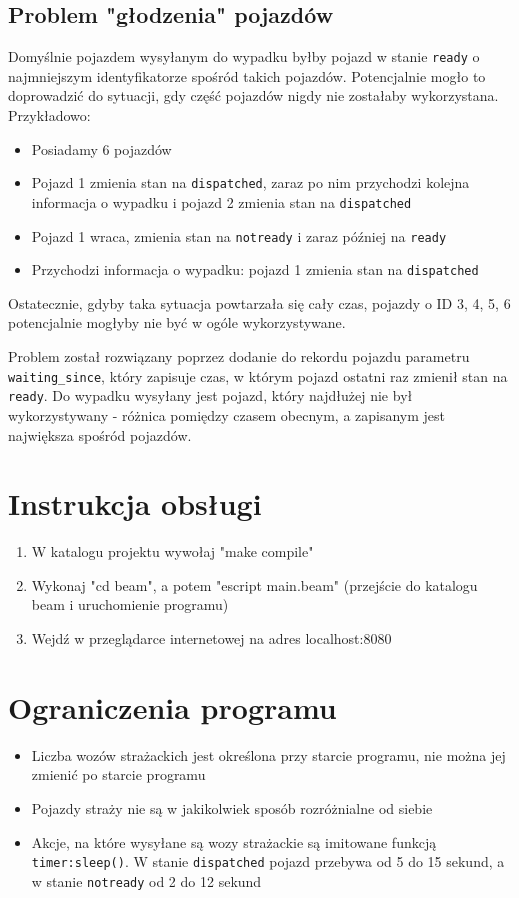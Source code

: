 \documentclass{article}
\begin{document}
\subsection{Problem "głodzenia" pojazdów}
Domyślnie pojazdem wysyłanym do wypadku byłby pojazd w stanie \texttt{ready} o najmniejszym identyfikatorze spośród takich pojazdów. Potencjalnie mogło to doprowadzić do sytuacji, gdy część pojazdów nigdy nie zostałaby wykorzystana. Przykładowo:
\begin{itemize}
	\item Posiadamy 6 pojazdów
	\item Pojazd 1 zmienia stan na \texttt{dispatched}, zaraz po nim przychodzi kolejna informacja o wypadku i pojazd 2 zmienia stan na \texttt{dispatched}
	\item Pojazd 1 wraca, zmienia stan na \texttt{notready} i zaraz później na \texttt{ready}
	\item Przychodzi informacja o wypadku: pojazd 1 zmienia stan na \texttt{dispatched}
\end{itemize}
Ostatecznie, gdyby taka sytuacja powtarzała się cały czas, pojazdy o ID 3, 4, 5, 6 potencjalnie mogłyby nie być w ogóle wykorzystywane.

Problem został rozwiązany poprzez dodanie do rekordu pojazdu parametru \texttt{waiting\_since}, który zapisuje czas, w którym pojazd ostatni raz zmienił stan na \texttt{ready}. Do wypadku wysyłany jest pojazd, który najdłużej nie był wykorzystywany - różnica pomiędzy czasem obecnym, a zapisanym jest największa spośród pojazdów.

\section{Instrukcja obsługi}
\begin{enumerate}
	\item W katalogu projektu wywołaj "make compile"
	\item Wykonaj "cd beam", a potem "escript main.beam" (przejście do katalogu beam i uruchomienie programu)
	\item Wejdź w przeglądarce internetowej na adres localhost:8080
\end{enumerate}

\section{Ograniczenia programu}
\begin{itemize}
	\item Liczba wozów strażackich jest określona przy starcie programu, nie można jej zmienić po starcie programu
	\item Pojazdy straży nie są w jakikolwiek sposób rozróżnialne od siebie
	\item Akcje, na które wysyłane są wozy strażackie są imitowane funkcją \texttt{timer:sleep()}. W stanie \texttt{dispatched} pojazd przebywa od 5 do 15 sekund, a w stanie \texttt{notready} od 2 do 12 sekund
\end{itemize}
\end{document}
